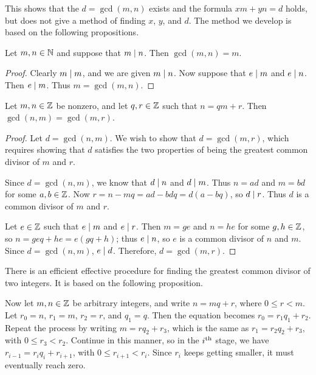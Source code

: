 \documentclass{amsart}
\begin{document}
This shows that the $d = \gcd(m,n)$ exists and the formula $xm+yn = d$ holds,
but does not give a method of finding $x$, $y$, and $d$.  The method we develop is based
on the following propositions.

\begin{Prop} \label{GCDObvious}
Let $m,n \in \mathbb{N}$ and suppose that $m \mid n$.
Then $\gcd(m,n) = m$.
\end{Prop}

\begin{proof}
Clearly $m \mid m$, and we are given $m \mid n$.
Now suppose that $e \mid m$ and $e \mid n$.
Then $e \mid m$.  Thus $m = \gcd(m,n)$.
\end{proof}

\begin{Prop} \label{GCDRecursive}
Let $m,n \in \mathbb{Z}$ be nonzero, and let $q,r \in \mathbb{Z}$ such that $n =
qm + r$. Then $\gcd(n,m) = \gcd(m,r)$.
\end{Prop}

\begin{proof}
Let $d = \gcd(n,m)$.  We wish to show that $d = \gcd(m,r)$, which
requires showing that $d$ satisfies the two properties of being the
greatest common divisor of $m$ and $r$.

Since $d = \gcd(n,m)$, we know that $d \mid n$ and $d \mid
m$. Thus $n = ad$ and $m = bd$ for some $a,b \in \mathbb{Z}$. Now $r = n
- mq = ad - bdq = d(a - bq)$, so $d \mid r$.  Thus $d$ is a
common divisor of $m$ and $r$.

Let $e \in \mathbb{Z}$ such that $e \mid m$ and $e \mid r$. Then
$m = ge$ and $n = he$ for some $g,h \in \mathbb{Z}$, so $n = geq + he =
e(gq + h)$; thus $e \mid n$, so $e$ is a common divisor of $n$
and $m$. Since $d = \gcd(n,m)$, $e \mid d$.  Therefore, $d =
\gcd(m,r)$.
\end{proof}

\newpage

There is an efficient effective procedure for finding the greatest
common divisor of two integers.  It is based on the following
proposition.

Now let $m,n \in \mathbb{Z}$ be arbitrary integers, and write $n = mq +
r$, where $0 \le r < m$. Let $r_{0} = n$, $r_{1} = m$, $r_{2} =
r$, and $q_{1} = q$. Then the equation becomes $r_{0} = r_{1}q_{1}
+ r_{2}$. Repeat the process by writing $m = rq_{2} + r_{3}$,
which is the same as $r_{1} = r_{2}q_{2} + r_{3}$, with $0 \le
r_{3} < r_{2}$. Continue in this manner, so in the $i^{\text{\rm{th}}}$ stage,
we have $r_{i-1} = r_{i}q_{i} + r_{i+1}$, with $0 \le r_{i+1} <
r_{i}$. Since $r_{i}$ keeps getting smaller, it must eventually
reach zero.
\end{document}
